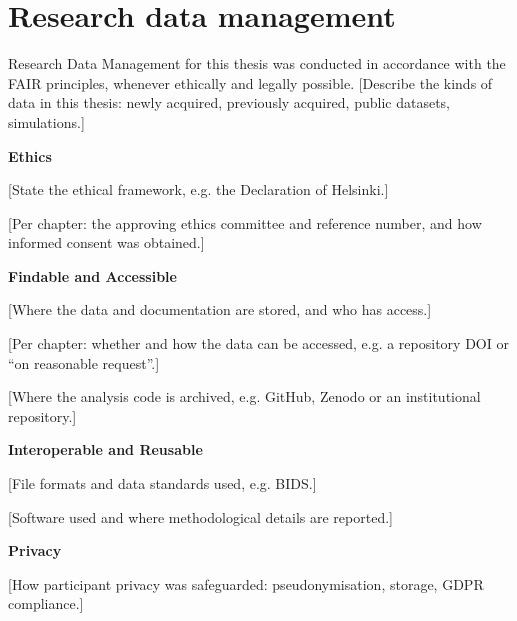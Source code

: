 \section*{Research data management}


\begingroup

Research Data Management for this thesis was conducted in accordance with the FAIR principles, whenever ethically and legally possible. [Describe the kinds of data in this thesis: newly acquired, previously acquired, public datasets, simulations.]

\textbf{Ethics}

[State the ethical framework, e.g. the Declaration of Helsinki.]

[Per chapter: the approving ethics committee and reference number, and how informed consent was obtained.]

\textbf{Findable and Accessible}

[Where the data and documentation are stored, and who has access.]

[Per chapter: whether and how the data can be accessed, e.g. a repository DOI or ``on reasonable request''.]

[Where the analysis code is archived, e.g. GitHub, Zenodo or an institutional repository.]

\textbf{Interoperable and Reusable}

[File formats and data standards used, e.g. BIDS.]

[Software used and where methodological details are reported.]

\textbf{Privacy}

[How participant privacy was safeguarded: pseudonymisation, storage, GDPR compliance.]

\endgroup
